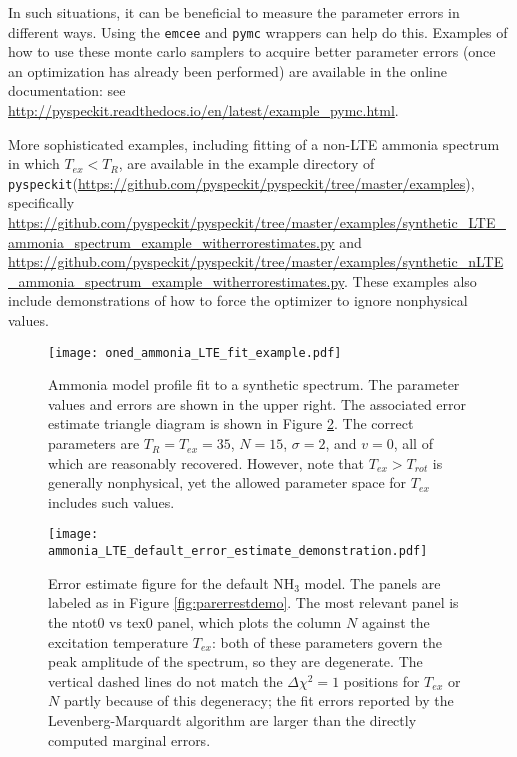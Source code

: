 \documentclass[twocolumn]{aastex62}
\newcommand{\pyspeckit}{\texttt{pyspeckit}\xspace}
\newcommand{\ammonia}{\ensuremath{\mathrm{NH}_3}\xspace}
\begin{document}
In such situations, it can be beneficial to measure the parameter errors
in different ways.  Using the \texttt{emcee} and \texttt{pymc} wrappers
can help do this.  Examples of how to use these monte carlo samplers
to acquire better parameter errors (once an optimization has already
been performed) are available in the online documentation:
see \url{http://pyspeckit.readthedocs.io/en/latest/example_pymc.html}.

More sophisticated examples, including fitting of a non-LTE ammonia spectrum
in which $T_{ex} < T_{R}$, are available in the example directory
of \pyspeckit (\url{https://github.com/pyspeckit/pyspeckit/tree/master/examples}),
specifically
\url{https://github.com/pyspeckit/pyspeckit/tree/master/examples/synthetic_LTE_ammonia_spectrum_example_witherrorestimates.py}
and
\url{https://github.com/pyspeckit/pyspeckit/tree/master/examples/synthetic_nLTE_ammonia_spectrum_example_witherrorestimates.py}.
These examples also include demonstrations of how to force the optimizer to
ignore nonphysical values.


\begin{figure*}[!htp]
\texttt{[image: oned\_ammonia\_LTE\_fit\_example.pdf]}
\caption{Ammonia model profile fit to a synthetic spectrum.
The parameter values and errors are shown in the upper right.  The associated
error estimate triangle diagram is shown in Figure \ref{fig:nh3parerrestdemo}.
The correct parameters are $T_{R}=T_{ex}=35$, $N=15$, $\sigma=2$, and $v=0$,
all of which are reasonably recovered.  However, note that $T_{ex} > T_{rot}$
is generally nonphysical, yet the allowed parameter space for $T_{ex}$ includes
such values.
}
\label{fig:nh3synthspecdemo}
\end{figure*}


\begin{figure*}[!htp]
\texttt{[image: ammonia\_LTE\_default\_error\_estimate\_demonstration.pdf]}
\caption{Error estimate figure for the default \ammonia model.  The panels
are labeled as in Figure \ref{fig:parerrestdemo}.  The most
relevant panel is the ntot0 vs tex0 panel, which plots the column $N$ against
the excitation temperature $T_{ex}$: both of these parameters govern the peak
amplitude of the spectrum, so they are degenerate.  The vertical dashed lines
do not match the $\Delta\chi^2=1$ positions for $T_{ex}$ or $N$ partly because
of this degeneracy; the fit errors reported by the Levenberg-Marquardt
algorithm are larger than the directly computed marginal errors.}
\label{fig:nh3parerrestdemo}
\end{figure*}
\end{document}
